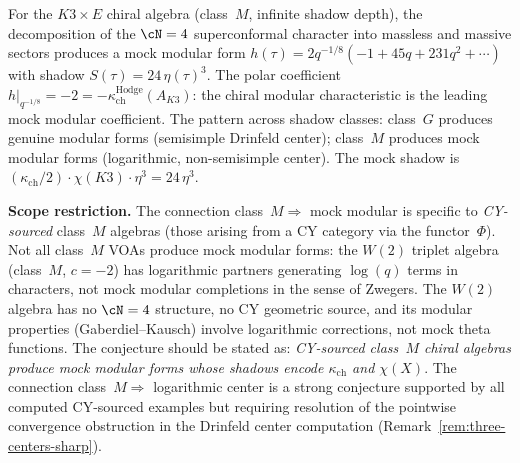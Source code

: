 \begin{remark}
\label{rem:class-m-mock-modular}
For the $K3 \times E$ chiral algebra (class~$M$, infinite shadow depth), the decomposition of the $\cN = 4$ superconformal character into massless and massive sectors produces a mock modular form $h(\tau) = 2q^{-1/8}(-1 + 45q + 231q^2 + \cdots)$ with shadow $S(\tau) = 24\,\eta(\tau)^3$. The polar coefficient $h|_{q^{-1/8}} = -2 = -\kappa_{\mathrm{ch}}^{\mathrm{Hodge}}(A_{K3})$: the chiral modular characteristic is the leading mock modular coefficient. The pattern across shadow classes: class~$G$ produces genuine modular forms (semisimple Drinfeld center); class~$M$ produces mock modular forms (logarithmic, non-semisimple center). The mock shadow is $(\kappa_{\mathrm{ch}}/2) \cdot \chi(K3) \cdot \eta^3 = 24\,\eta^3$.

\medskip\noindent
\textbf{Scope restriction.} The connection class~$M \Longrightarrow$ mock modular is specific to \emph{CY-sourced} class~$M$ algebras (those arising from a CY category via the functor~$\Phi$). Not all class~$M$ VOAs produce mock modular forms: the $W(2)$ triplet algebra (class~$M$, $c = -2$) has logarithmic partners generating $\log(q)$ terms in characters, not mock modular completions in the sense of Zwegers. The $W(2)$ algebra has no $\cN = 4$ structure, no CY geometric source, and its modular properties (Gaberdiel--Kausch) involve logarithmic corrections, not mock theta functions. The conjecture should be stated as: \emph{CY-sourced class~$M$ chiral algebras produce mock modular forms whose shadows encode $\kappa_{\mathrm{ch}}$ and $\chi(X)$}. The connection class~$M \Longrightarrow$ logarithmic center is a strong conjecture supported by all computed CY-sourced examples but requiring resolution of the pointwise convergence obstruction in the Drinfeld center computation (Remark~\ref{rem:three-centers-sharp}).
\end{remark}

